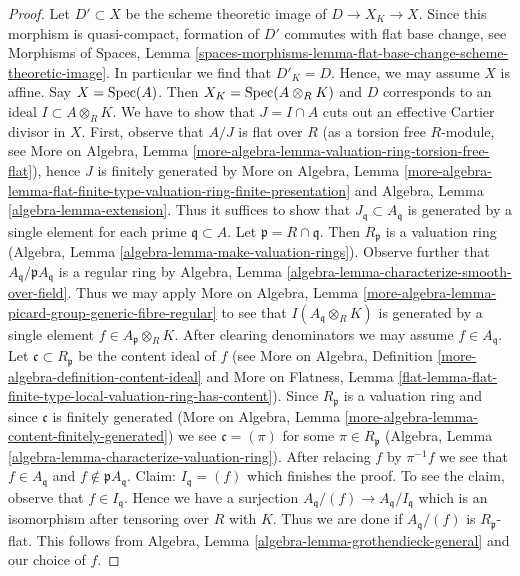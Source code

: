 \begin{proof}
Let $D' \subset X$ be the scheme theoretic image of $D \to X_K \to X$.
Since this morphism is quasi-compact, formation of $D'$
commutes with flat base change, see
Morphisms of Spaces, Lemma
\ref{spaces-morphisms-lemma-flat-base-change-scheme-theoretic-image}.
In particular we find that $D'_K = D$. Hence,
we may assume $X$ is affine. Say $X = \operatorname{Spec}(A)$.
Then $X_K = \operatorname{Spec}(A \otimes_R K)$ and $D$ corresponds to
an ideal $I \subset A \otimes_R K$. We have to show that
$J = I \cap A$ cuts out an effective Cartier divisor in $X$.
First, observe that $A/J$ is flat over $R$ (as a torsion
free $R$-module, see More on Algebra, Lemma
\ref{more-algebra-lemma-valuation-ring-torsion-free-flat}),
hence $J$ is finitely generated by
More on Algebra, Lemma
\ref{more-algebra-lemma-flat-finite-type-valuation-ring-finite-presentation}
and
Algebra, Lemma \ref{algebra-lemma-extension}.
Thus it suffices to show that $J_\mathfrak q \subset A_\mathfrak q$
is generated by a single element for each prime $\mathfrak q \subset A$.
Let $\mathfrak p = R \cap \mathfrak q$. Then
$R_\mathfrak p$ is a valuation ring
(Algebra, Lemma \ref{algebra-lemma-make-valuation-rings}).
Observe further that $A_\mathfrak q/\mathfrak p A_\mathfrak q$
is a regular ring by Algebra, Lemma
\ref{algebra-lemma-characterize-smooth-over-field}.
Thus we may apply More on Algebra, Lemma
\ref{more-algebra-lemma-picard-group-generic-fibre-regular}
to see that $I(A_\mathfrak q \otimes_R K)$ is generated by
a single element $f \in A_\mathfrak p \otimes_R K$.
After clearing denominators we may assume $f \in A_\mathfrak q$.
Let $\mathfrak c \subset R_\mathfrak p$ be the content ideal of $f$
(see More on Algebra, Definition \ref{more-algebra-definition-content-ideal}
and More on Flatness, Lemma
\ref{flat-lemma-flat-finite-type-local-valuation-ring-has-content}).
Since $R_\mathfrak p$ is a valuation ring and
since $\mathfrak c$ is finitely generated
(More on Algebra, Lemma \ref{more-algebra-lemma-content-finitely-generated})
we see $\mathfrak c = (\pi)$ for some $\pi \in R_\mathfrak p$
(Algebra, Lemma \ref{algebra-lemma-characterize-valuation-ring}).
After relacing $f$ by $\pi^{-1}f$ we see that $f \in A_\mathfrak q$
and $f \not \in \mathfrak pA_\mathfrak q$.
Claim: $I_\mathfrak q = (f)$ which finishes the proof.
To see the claim, observe that $f \in I_\mathfrak q$.
Hence we have a surjection $A_\mathfrak q/(f) \to A_\mathfrak q/I_\mathfrak q$
which is an isomorphism after tensoring over $R$ with $K$.
Thus we are done if
$A_\mathfrak q/(f)$ is $R_\mathfrak p$-flat.
This follows from
Algebra, Lemma \ref{algebra-lemma-grothendieck-general}
and our choice of $f$.
\end{proof}

